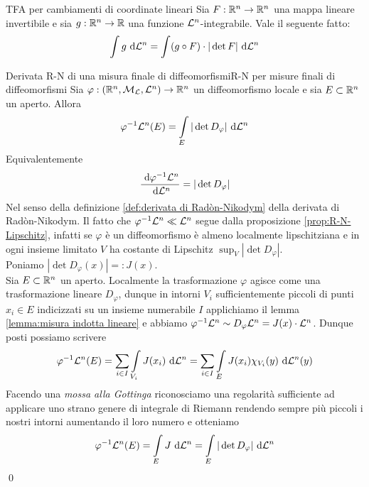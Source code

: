 \documentclass[openany]{book}
\begin{document}
\begin{theorem}{TFA per cambiamenti di coordinate lineari}{}
    Sia $F : \mathbb{R}^n \to \mathbb{R}^n$ una mappa lineare invertibile e sia $g: \mathbb{R}^n \to \mathbb{R}$ una funzione $\mathcal{L}^n$-integrabile. Vale il seguente fatto:
    \[\intop g \de \L^n = \intop (g \circ F) \cdot |\det F| \de \L^n \] 
\end{theorem}


\begin{theorem}{Derivata R-N di una misura finale di diffeomorfismi}{R-N per misure finali di diffeomorfismi}
    Sia $\varphi : (\mathbb{R}^n, \mathcal{M}_{\mathcal{L}}, \mathcal{L}^n) \to \mathbb{R}^n$ un diffeomorfismo locale e sia $E \subset \mathbb{R}^n$ un aperto. Allora 
    \[\varphi^{-1}\L^n(E) = \intop_E|\det D_\varphi|\de \L^n\]
    Equivalentemente
    \[\frac{\text{ d} \varphi^{-1} \mathcal{L}^n}{\text{ d} \mathcal{L}^n} = |\det D_\varphi|\]
    Nel senso della definizione \ref{def:derivata di Radòn-Nikodym} della derivata di Radòn-Nikodym.
    \proof
    Il fatto che $\varphi^{-1}\mathcal{L}^n \ll \mathcal{L}^n$ segue dalla proposizione \ref{prop:R-N-Lipschitz}, infatti se $\varphi$ è un diffeomorfismo è almeno localmente lipschitziana e in ogni insieme limitato $V$ ha costante di Lipschitz $\sup_V |\det D_\varphi|$.\\
    Poniamo $|\det D_\varphi(x)| =: J(x)$.\\
    Sia $E\subset \mathbb{R}^n$ un aperto. Localmente la trasformazione $\varphi$ agisce come una trasformazione lineare $D_\varphi$, dunque in intorni $V_i$ sufficientemente piccoli di punti $x_i\in E$ indicizzati su un insieme numerabile $I$ applichiamo il lemma \ref{lemma:misura indotta lineare} e abbiamo $\varphi^{-1} \mathcal{L}^n \sim D_\varphi \mathcal{L}^n = J(x)\cdot \mathcal{L}^n$. Dunque posti possiamo scrivere
    \[\varphi^{-1}\L^n(E) = \sum_{i \in I} \intop_{V_i} J(x_i)\de \L^n = \sum_{i \in I} \intop_E J(x_i) \chi_{V_i}(y)\de \L^n(y)\]
    Facendo una \textit{mossa alla Gottinga} riconosciamo una regolarità sufficiente ad applicare uno strano genere di integrale di Riemann rendendo sempre più piccoli i nostri intorni aumentando il loro numero e otteniamo
    \[\varphi^{-1}\L^n(E) = \intop_E J \de \L^n = \intop_E |\det D_\varphi|\de \L^n\]
    \qed 
\end{theorem}
\end{document}
